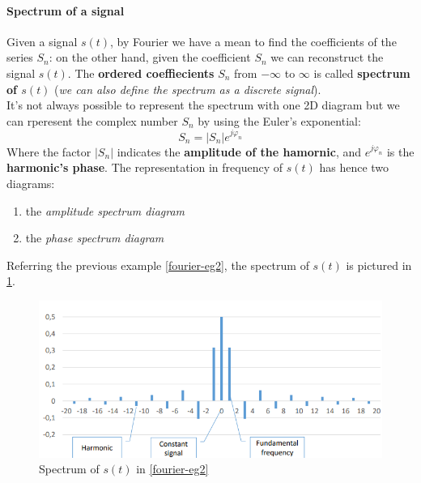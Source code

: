 \documentclass[10pt,a4paper]{report}
\theoremstyle{definition}
\begin{document}
\paragraph{Spectrum of a signal}
Given a signal $s(t)$, by Fourier we have a mean to find the coefficients of the series $S_{n}$: on the other hand, given the coefficient $S_{n}$ we can reconstruct the signal $s(t)$. The \textbf{ordered coeffiecients} $S_{n}$ from $-\infty$ to $\infty$ is called \textbf{spectrum of $s(t)$} (\textit{we can also define the spectrum as a discrete signal}).\\
It's not always possible to represent the spectrum with one 2D diagram but we can rperesent the complex number $S_{n}$ by using the Euler's exponential:
\begin{equation}
	S_{n} = |S_{n}|e^{j\varphi_{n}}
\end{equation}
Where the factor $|S_{n}|$ indicates the \textbf{amplitude of the hamornic}, and $e^{j\varphi_{n}}$ is the \textbf{harmonic's phase}. 
The representation in frequency of $s(t)$ has hence two diagrams:
\begin{enumerate}
	\item the \textit{amplitude spectrum diagram}
	\item the \textit{phase spectrum diagram}
\end{enumerate}
Referring the previous example \ref{fourier-eg2}, the spectrum of $s(t)$ is pictured in \ref{spectrum-eg2}.

\begin{figure}[h]
	\centering\includegraphics[scale=0.50]{images/Pasted image 20230531165703.png}
	\caption{Spectrum of $s(t)$ in \ref{fourier-eg2}}
	\label{spectrum-eg2}
	
\end{figure}
\end{document}
